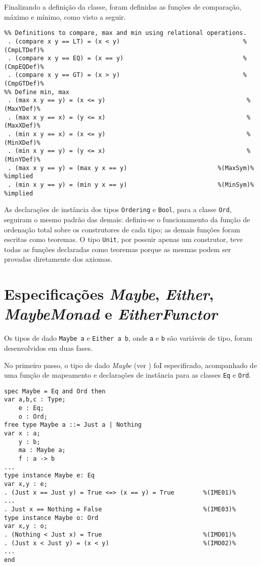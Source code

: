 Finalizando a definição da classe, foram definidas as funções de comparação, máximo e mínimo, como visto a seguir.

\begin{Verbatim}
%% Definitions to compare, max and min using relational operations.
 . (compare x y == LT) = (x < y)                                  %(CmpLTDef)%
 . (compare x y == EQ) = (x == y)                                 %(CmpEQDef)%
 . (compare x y == GT) = (x > y)                                  %(CmpGTDef)%
%% Define min, max                                               
 . (max x y == y) = (x <= y)                                       %(MaxYDef)%
 . (max x y == x) = (y <= x)                                       %(MaxXDef)%
 . (min x y == x) = (x <= y)                                       %(MinXDef)%
 . (min x y == y) = (y <= x)                                       %(MinYDef)%
 . (max x y == y) = (max y x == y)                         %(MaxSym)% %implied
 . (min x y == y) = (min y x == y)                         %(MinSym)% %implied
\end{Verbatim}

As declarações de instância dos tipos \Verb.Ordering. e \Verb.Bool., para a classe \Verb.Ord., seguiram o mesmo padrão das demais: definiu-se o funcionamento da função de ordenação total sobre os construtores de cada tipo; as demais funções foram escritas como teoremas.
O tipo \Verb.Unit., por possuir apenas um construtor, teve todas as funções declaradas como teoremas porque as mesmas podem ser provadas diretamente dos axiomas.

\section{Especificações \textit{Maybe}, \textit{Either}, \textit{MaybeMonad} e \textit{EitherFunctor}}
Os tipos de dado \Verb.Maybe a. e \Verb.Either a b., onde \Verb.a. e \Verb.b. são variáveis de tipo, foram desenvolvidos em duas fases.

No primeiro passo, o tipo de dado \textit{Maybe} (ver ) foI especificado, acompanhado de uma função de mapeamento e declarações de instância para as classes \Verb.Eq. e \Verb.Ord..

\begin{Verbatim}
spec Maybe = Eq and Ord then
var a,b,c : Type;
    e : Eq;
    o : Ord;
free type Maybe a ::= Just a | Nothing
var x : a;
    y : b;
    ma : Maybe a;
    f : a -> b
...
type instance Maybe e: Eq
var x,y : e; 
. (Just x == Just y) = True <=> (x == y) = True        %(IME01)%
...
. Just x == Nothing = False                            %(IME03)%
type instance Maybe o: Ord
var x,y : o;
. (Nothing < Just x) = True                            %(IMO01)%
. (Just x < Just y) = (x < y)                          %(IMO02)%
...
end
\end{Verbatim}



